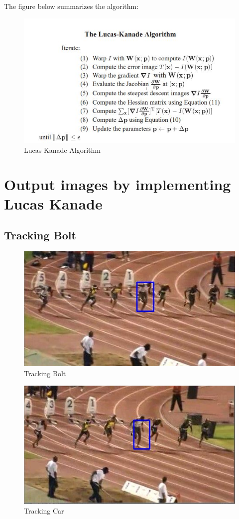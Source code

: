 \documentclass[12pt]{article}
\begin{document}
The figure below summarizes the algorithm:
\begin{figure}[h]
    \centering
    \includegraphics[width=13cm]{lucas}
    \caption{Lucas Kanade Algorithm}
    \label{fig: Lucas Kanade Algorithm}
\end{figure}

\section{Output images by implementing Lucas Kanade}
\subsection{Tracking Bolt}
\begin{figure}[h]
    \centering
    \includegraphics[width=12cm]{trackbolt1}
    \caption{Tracking Bolt}
    \label{fig:Tracking Bolt}
\end{figure}
\newpage
\begin{figure}[h]
    \centering
    \includegraphics[width=12cm]{trackbolt2}
    \caption{Tracking Car}
    \label{fig:Tracking Car}
\end{figure}
\end{document}
